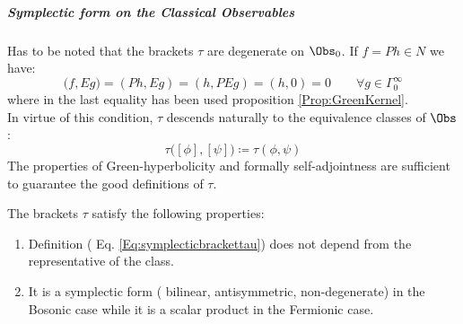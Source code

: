 \documentclass[Main]{subfiles}
\begin{document}
			\subparagraph{Symplectic form on the Classical Observables}
				Has to be noted that the brackets $\tau$ are degenerate on $\Obs_0$.
				If $f=Ph \in N$ we have:
				\begin{displaymath}
					\big( f , E g \big) = (P h , E g) = (h, PE g) = (h,0) = 0 \qquad \forall g \in \Gamma_0^\infty
				\end{displaymath}
				where in the last equality has been used proposition \ref{Prop:GreenKernel}.\\
				In virtue of this condition, 	$\tau$ descends naturally to the equivalence classes of $\Obs$:
				\begin{equation}\label{Eq:symplecticbrackettau}
					\tau\big( [\phi], [\psi] \big) \coloneqq \tau(\phi, \psi)
				\end{equation}
				The properties of Green-hyperbolicity and formally self-adjointness are sufficient to guarantee the good definitions of $\tau$.
				\begin{proposition}
				The brackets  $\tau$ satisfy the following properties:
					\begin{enumerate}
						\item\label{Th:WellPosed} %
							Definition ( Eq. \ref{Eq:symplecticbrackettau}) does not depend from the representative of the class.
						\item\label{Th:Symplectic} It is a symplectic form ( bilinear, antisymmetric, non-degenerate) in the Bosonic case while it is a scalar product in	the Fermionic case.
					\end{enumerate}
				\end{proposition}
\end{document}
